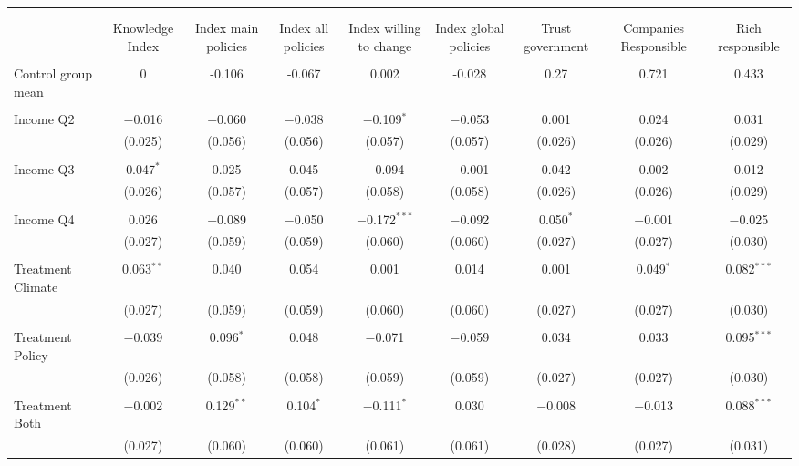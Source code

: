 
\begin{tabular}{@{\extracolsep{5pt}}lcccccccc} 
\\[-1.8ex]\hline 
\hline \\[-1.8ex] 
\\[-1.8ex] & Knowledge Index & Index main policies & Index all policies & Index willing to change & Index global policies & Trust government & Companies Responsible & Rich responsible \\ 
\hline \\[-1.8ex] 
 Control group mean & 0 & -0.106 & -0.067 & 0.002 & -0.028 & 0.27 & 0.721 & 0.433  \\ \hline \\[-1.8ex] Income Q2 & $-$0.016 & $-$0.060 & $-$0.038 & $-$0.109$^{*}$ & $-$0.053 & 0.001 & 0.024 & 0.031 \\ 
  & (0.025) & (0.056) & (0.056) & (0.057) & (0.057) & (0.026) & (0.026) & (0.029) \\ 
  & & & & & & & & \\ 
 Income Q3 & 0.047$^{*}$ & 0.025 & 0.045 & $-$0.094 & $-$0.001 & 0.042 & 0.002 & 0.012 \\ 
  & (0.026) & (0.057) & (0.057) & (0.058) & (0.058) & (0.026) & (0.026) & (0.029) \\ 
  & & & & & & & & \\ 
 Income Q4 & 0.026 & $-$0.089 & $-$0.050 & $-$0.172$^{***}$ & $-$0.092 & 0.050$^{*}$ & $-$0.001 & $-$0.025 \\ 
  & (0.027) & (0.059) & (0.059) & (0.060) & (0.060) & (0.027) & (0.027) & (0.030) \\ 
  & & & & & & & & \\ 
 Treatment Climate & 0.063$^{**}$ & 0.040 & 0.054 & 0.001 & 0.014 & 0.001 & 0.049$^{*}$ & 0.082$^{***}$ \\ 
  & (0.027) & (0.059) & (0.059) & (0.060) & (0.060) & (0.027) & (0.027) & (0.030) \\ 
  & & & & & & & & \\ 
 Treatment Policy & $-$0.039 & 0.096$^{*}$ & 0.048 & $-$0.071 & $-$0.059 & 0.034 & 0.033 & 0.095$^{***}$ \\ 
  & (0.026) & (0.058) & (0.058) & (0.059) & (0.059) & (0.027) & (0.027) & (0.030) \\ 
  & & & & & & & & \\ 
 Treatment Both & $-$0.002 & 0.129$^{**}$ & 0.104$^{*}$ & $-$0.111$^{*}$ & 0.030 & $-$0.008 & $-$0.013 & 0.088$^{***}$ \\ 
  & (0.027) & (0.060) & (0.060) & (0.061) & (0.061) & (0.028) & (0.027) & (0.031) \\ 

\end{tabular}
